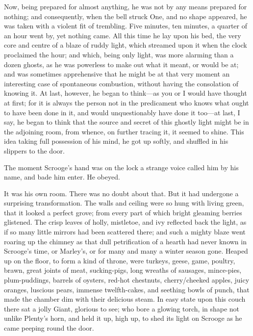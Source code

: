 Now, being prepared for almost anything, he was not by any means prepared for
nothing; and consequently, when the bell struck One, and no shape appeared, he
was taken with a violent fit of trembling. Five minutes, ten minutes, a quarter
of an hour went by, yet nothing came. All this time he lay upon his bed, the
very core and centre of a blaze of ruddy light, which streamed upon it when the
clock proclaimed the hour; and which, being only light, was more alarming than a
dozen ghosts, as he was powerless to make out what it meant, or would be at; and
was sometimes apprehensive that he might be at that very moment an interesting
case of spontaneous combustion, without having the consolation of knowing it. At
last, however, he began to think—as you or I would have thought at first; for it
is always the person not in the predicament who knows what ought to have been
done in it, and would unquestionably have done it too—at last, I say, he began
to think that the source and secret of this ghostly light might be in the
adjoining room, from whence, on further tracing it, it seemed to shine. This
idea taking full possession of his mind, he got up softly, and shuffled in his
slippers to the door.

The moment Scrooge's hand was on the lock a strange voice called him by his
name, and bade him enter. He obeyed.

It was his own room. There was no doubt about that. But it had undergone a
surprising transformation. The walls and ceiling were so hung with living green,
that it looked a perfect grove; from every part of which bright gleaming berries
glistened. The crisp leaves of holly, mistletoe, and ivy reflected back the
light, as if so many little mirrors had been scattered there; and such a mighty
blaze went roaring up the chimney as that dull petrification of a hearth had
never known in Scrooge's time, or Marley's, or for many and many a winter season
gone. Heaped up on the floor, to form a kind of throne, were turkeys, geese,
game, poultry, brawn, great joints of meat, sucking-pigs, long wreaths of
sausages, mince-pies, plum-pud\-dings, barrels of oysters, red-hot chestnuts,
cherry\-/cheeked apples, juicy oranges, luscious pears, immense twelfth-cakes,
and seething bowls of punch, that made the chamber dim with their delicious
steam. In easy state upon this couch there sat a jolly Giant, glorious to see;
who bore a glowing torch, in shape not unlike Plenty's horn, and held it up,
high up, to shed its light on Scrooge as he came peeping round the door.

